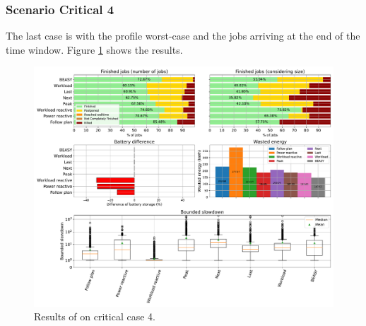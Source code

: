 
\subsubsection{Scenario Critical 4}

The last case is with the profile worst-case and the jobs arriving at the end of the time window. Figure \ref{fig:beasy_critical_4} shows the results. 

\begin{figure}[!htb]
    \centering
    \includegraphics[scale=0.39]{Images/Heuristic/profile_worst_workload_2_with_noise.pdf}
    \caption{Results of \emph{\systemName} on critical case 4.}
    \label{fig:beasy_critical_4}
\end{figure}

